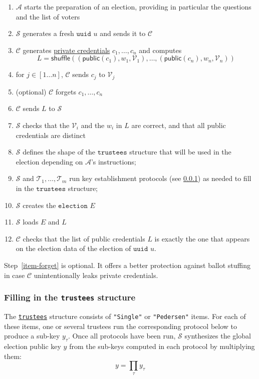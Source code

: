 \documentclass[a4paper]{article}
\newcommand{\public}{\textsf{public}}
\newcommand{\shuffle}{\textsf{shuffle}}
\newcommand{\uuid}{\texttt{uuid}}
\newcommand{\election}{\texttt{election}}
\begin{document}
\begin{enumerate}
\item $\mathcal{A}$ starts the preparation of an election, providing
  in particular the questions and the list of voters
\item $\mathcal{S}$ generates a fresh \hyperref[basic-types]{$\uuid$} $u$ and
  sends it to $\mathcal{C}$
\item $\mathcal{C}$ generates \hyperref[credentials]{private credentials}
  $c_1,\dots,c_n$ and computes
  \[L=\shuffle((\public(c_1),w_1,\mathcal{V}_1),\dots,(\public(c_n),w_n,\mathcal{V}_n))\]
\item for $j\in[1\dots n]$, $\mathcal{C}$ sends $c_j$ to $\mathcal{V}_j$
\item \label{item-forget} (optional) $\mathcal{C}$ forgets $c_1,\dots,c_n$
 \item $\mathcal{C}$ sends $L$ to $\mathcal{S}$
 \item $\mathcal{S}$ checks that the $\mathcal{V}_i$ and the $w_i$ in
   $L$ are correct, and that all public credentials are distinct
 \item $\mathcal{S}$ defines the shape of the
   \hyperref[trustees]{$\texttt{trustees}$} structure that will be
   used in the election depending on $\mathcal{A}$'s instructions;
 \item $\mathcal{S}$ and $\mathcal{T}_1,\dotsc,\mathcal{T}_m$ run key
   establishment protocols (see \ref{process-filling-trustees}) as
     needed to fill in the $\texttt{trustees}$ structure;
\item $\mathcal{S}$ creates the \hyperref[elections]{$\election$} $E$
\item $\mathcal{S}$ loads $E$ and $L$ %
\item $\mathcal{C}$ checks that the list of public credentials $L$
  is exactly the one that appears on the election data of the election of
  {$\uuid$} $u$.
\end{enumerate}
Step~\ref{item-forget} is optional. It offers a better protection
against ballot stuffing in case $\mathcal{C}$ unintentionally leaks
private credentials.

\subsubsection{Filling in the \texttt{trustees} structure}
\label{process-filling-trustees}

The \hyperref[trustees]{\texttt{trustees}} structure consists of
\texttt{"Single"} or \texttt{"Pedersen"} items. For each of these
items, one or several trustees run the corresponding protocol below to
produce a sub-key $y_\tau$. Once all protocols have been run,
$\mathcal{S}$ synthesizes the global election public key $y$ from the
sub-keys computed in each protocol by multiplying them:
\[
  y=\prod_\tau y_\tau
\]
\end{document}
